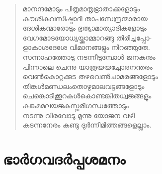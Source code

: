\begin{verse}
മാനന്ദമോടും പിതൃമാതൃഭ്രാതാക്കളോടും\\
കൗശികവസിഷ്ഠാദി താപസേന്ദ്രന്മാരായ\\
ദേശികന്മാരോടും ഭൃത്യാമാത്യാദികളോടും\\
വേഗമോടയോധ്യയ്ക്കാമ്മാറങ്ങു തിരിച്ചപ്പോ-\\
ളാകാശദേശേ വിമാനങ്ങളും നിറഞ്ഞുതേ.\\
സന്നാഹത്തോടു നടന്നീടുമ്പോള്‍ ജനകനും\\
പിന്നാലെ ചെന്നു യാത്രയയച്ചോരനന്തരം\\
വെണ്‍കൊറ്റക്കുട തഴവെണ്‍ചാമരങ്ങളോടും\\
തിങ്കള്‍മണ്ഡലംതൊഴുമാലവട്ടങ്ങളോടും\\
ചെങ്കൊടിക്കൂറകള്‍കൊണ്ടങ്കിതധ്വജങ്ങളും\\
കുങ്കുമമലയജകസ്തൂരീഗന്ധത്തോടും\\
നടന്നു വിരവോടു മൂന്നു യോജന വഴി\\
കടന്നനേരം കണ്ടു ദുര്‍ന്നിമിത്തങ്ങളെല്ലാം.
\end{verse}


\section{ഭാര്‍ഗവദര്‍പ്പശമനം}

